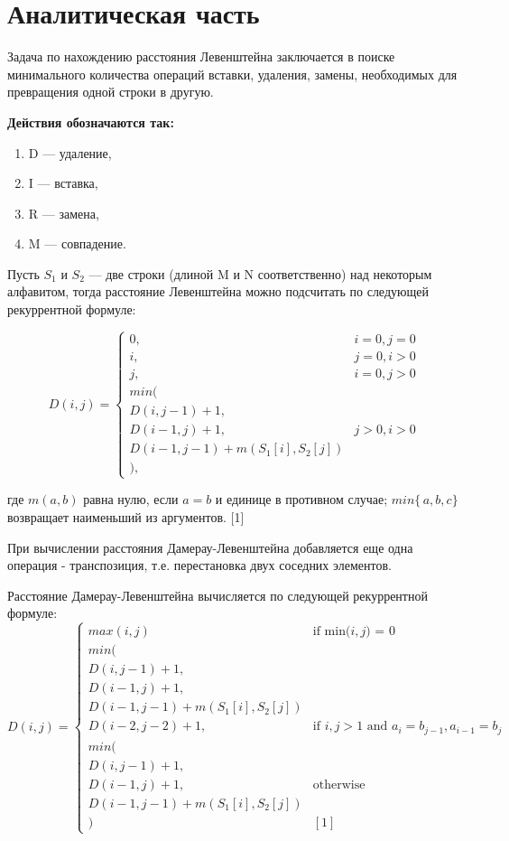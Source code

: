 \documentclass[12pt]{report}
\begin{document}
\chapter{Аналитическая часть}
Задача по нахождению расстояния Левенштейна заключается в поиске минимального количества операций вставки, удаления, замены, необходимых для превращения одной строки в другую.
 
\textbf{Действия обозначаются так:} 
\begin{enumerate}
  	\item D — удаление,
	\item I  — вставка,
	\item R  — замена,
	\item M — совпадение.
\end{enumerate}

Пусть $S_{1}$ и $S_{2}$ — две строки (длиной M и N соответственно) над некоторым алфавитом, тогда расстояние Левенштейна можно подсчитать по следующей рекуррентной формуле:

\begin{displaymath}
D(i,j) = \left\{ \begin{array}{ll}
 0, & \textrm{$i = 0, j = 0$}\\
 i, & \textrm{$j = 0, i > 0$}\\
 j, & \textrm{$i = 0, j > 0$}\\
min(\\
D(i,j-1)+1,\\
D(i-1, j) +1, &\textrm{$j>0, i>0$}\\
D(i-1, j-1) + m(S_{1}[i], S_{2}[j])\\
),
  \end{array} \right.
\end{displaymath}

где $m(a,b)$ равна нулю, если $a=b$ и единице в противном случае; $min\{\,a,b,c\}$ возвращает наименьший из аргументов. [1]

При вычислении расстояния Дамерау-Левенштейна добавляется еще одна операция - транспозиция, т.е. перестановка двух соседних элементов.

Расстояние Дамерау-Левенштейна вычисляется по следующей рекуррентной формуле:
\begin{displaymath}
D(i,j) = \left\{ \begin{array}{ll}
max(i, j)&\textrm {if min($i,j$) = 0}\\
min(\\
D(i,j-1)+1,\\
D(i-1, j) +1,\\
D(i-1, j-1) + m(S_{1}[i], S_{2}[j])\\
D(i-2, j-2) + 1, &\textrm{if $i,j>1$ and $a_{i} = b_{j-1},a_{i-1}=b_{j} $}\\
min(\\
D(i,j-1)+1,\\
D(i-1, j) +1, &\textrm {otherwise}\\
D(i-1, j-1) + m(S_{1}[i], S_{2}[j])\\
) &  [1]
  \end{array} \right.
\end{displaymath}
\end{document}
